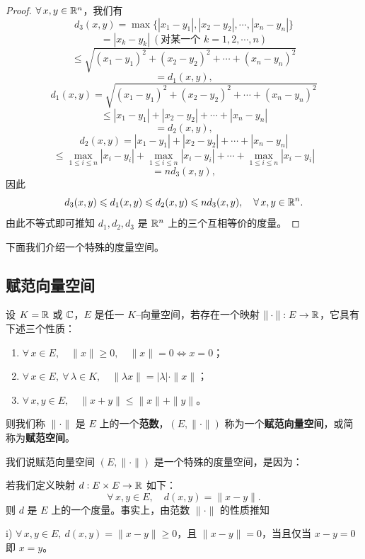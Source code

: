 \begin{proof}

$\forall\,x,y\in\mathbb{R}^n$，我们有
\[d_3(x,y)=\max\{|x_1-y_1|,|x_2-y_2|,\cdots,|x_n-y_n|\}\]
\[=|x_k-y_k|\ (\text{对某一个 }k=1,2,\cdots,n)\]
\[\leqslant\sqrt{(x_1-y_1)^2+(x_2-y_2)^2+\cdots+(x_n-y_n)^2}\]
\[=d_1(x,y),\]
\[d_1(x,y)=\sqrt{(x_1-y_1)^2+(x_2-y_2)^2+\cdots+(x_n-y_n)^2}\]
\[\leqslant|x_1-y_1|+|x_2-y_2|+\cdots+|x_n-y_n|\]
\[=d_2(x,y),\]
\[d_2(x,y)=|x_1-y_1|+|x_2-y_2|+\cdots+|x_n-y_n|\]
\[\leqslant\max_{1\leqslant i\leqslant n}|x_i-y_i|+\max_{1\leqslant i\leqslant n}|x_i-y_i|+\cdots+\max_{1\leqslant i\leqslant n}|x_i-y_i|\]
\[=nd_3(x,y),\]
因此
\[d_3(x,y)\leqslant d_1(x,y)\leqslant d_2(x,y)\leqslant nd_3(x,y),\quad\forall\,x,y\in\mathbb{R}^n.\]
由此不等式即可推知 $d_1,d_2,d_3$ 是 $\mathbb{R}^n$ 上的三个互相等价的度量。

\end{proof}

下面我们介绍一个特殊的度量空间。

\subsection{赋范向量空间}
	\label{sec:10-1-4}

\begin{mydef*}{}

设 $K=\mathbb{R}$ 或 $\mathbb{C}$，$E$ 是任一 $K$--向量空间，若存在一个映射 $\|\cdot\|:E\to\mathbb{R}$，它具有下述三个性质：
\begin{enumerate}[label=\arabic{enumi})]
\item $\forall\,x\in E,\quad\|x\|\geqslant0,\quad\|x\|=0\Longleftrightarrow x=0$；
\item $\forall\,x\in E,\ \forall\,\lambda\in K,\quad\|\lambda x\|=|\lambda|\cdot\|x\|$；
\item $\forall\,x,y\in E,\quad\|x+y\|\leqslant\|x\|+\|y\|$。
\end{enumerate}
则我们称 $\|\cdot\|$ 是 $E$ 上的一个\textbf{范数}，$(E,\|\cdot\|)$ 称为一个\textbf{赋范向量空间}，或简称为\textbf{赋范空间}。

\end{mydef*}

我们说赋范向量空间 $(E,\|\cdot\|)$ 是一个特殊的度量空间，是因为：

若我们定义映射 $d:E\times E\to\mathbb{R}$ 如下：
\[\forall\,x,y\in E,\quad d(x,y)=\|x-y\|.\]
则 $d$ 是 $E$ 上的一个度量。事实上，由范数 $\|\cdot\|$ 的性质推知

i) $\forall\,x,y\in E,\ d(x,y)=\|x-y\|\geqslant0$，且 $\|x-y\|=0$，当且仅当 $x-y=0$ 即 $x=y$。

